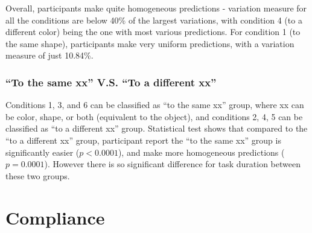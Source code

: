\documentclass{article}
\begin{document}
Overall, participants make quite homogeneous predictions - variation measure for all the conditions are below 40\% of the largest variations, with condition 4 (to a different color) being the one with most various predictions. For condition 1 (to the same shape), participants make very uniform predictions, with a variation measure of just 10.84\%.

\subsubsection*{``To the same xx'' V.S. ``To a different xx''}

Conditions 1, 3, and 6 can be classified as ``to the same xx'' group, where xx can be color, shape, or both (equivalent to the object), and conditions 2, 4, 5 can be classified as ``to a different xx'' group. Statistical test shows that compared to the ``to a different xx'' group, participant report the ``to the same xx'' group is significantly easier ($p<0.0001$), and make more homogeneous predictions ($p=0.0001$). However there is so significant difference for task duration between these two groups.

\section{Compliance}
\end{document}
